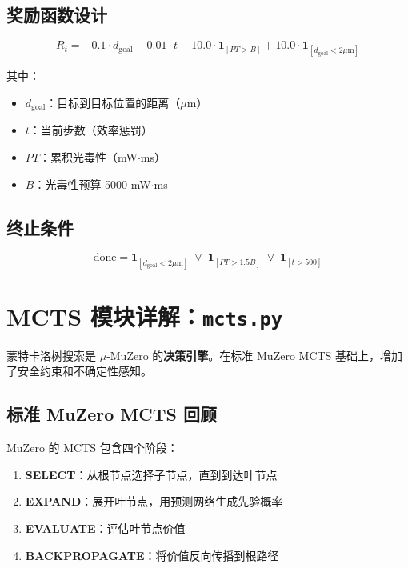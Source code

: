 \documentclass[UTF8, a4paper]{ctexart}
\begin{document}
\subsection{奖励函数设计}

\begin{equation}
\boxed{R_t = -0.1 \cdot d_{\text{goal}} - 0.01 \cdot t - 10.0 \cdot \mathbf{1}_{[PT > B]} + 10.0 \cdot \mathbf{1}_{[d_{\text{goal}} < 2\mu\text{m}]}}
\end{equation}

其中：
\begin{itemize}[leftmargin=2em]
    \item $d_{\text{goal}}$：目标到目标位置的距离（$\mu$m）
    \item $t$：当前步数（效率惩罚）
    \item $PT$：累积光毒性（mW$\cdot$ms）
    \item $B$：光毒性预算 5000 mW$\cdot$ms
\end{itemize}

\subsection{终止条件}

\begin{equation}
\text{done} = \mathbf{1}_{[d_{\text{goal}} < 2\mu\text{m}]} \;\lor\; \mathbf{1}_{[PT > 1.5B]} \;\lor\; \mathbf{1}_{[t > 500]}
\end{equation}

\newpage
\section{MCTS 模块详解：\texttt{mcts.py}}

蒙特卡洛树搜索是 $\mu$-MuZero 的\textbf{决策引擎}。在标准 MuZero MCTS 基础上，增加了安全约束和不确定性感知。

\subsection{标准 MuZero MCTS 回顾}

MuZero 的 MCTS 包含四个阶段：
\begin{enumerate}[leftmargin=2em]
    \item \textbf{SELECT}：从根节点选择子节点，直到到达叶节点
    \item \textbf{EXPAND}：展开叶节点，用预测网络生成先验概率
    \item \textbf{EVALUATE}：评估叶节点价值
    \item \textbf{BACKPROPAGATE}：将价值反向传播到根路径
\end{enumerate}
\end{document}
